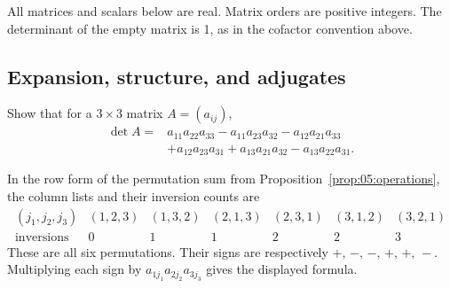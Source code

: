 All matrices and scalars below are real. Matrix orders are positive integers.
The determinant of the empty matrix is 1, as in the cofactor convention above.

\subsection*{Expansion, structure, and adjugates}

\begin{problem}\label{ex:05:six-terms}
Show that for a \(3\times3\) matrix \(A=(a_{ij})\),
\[
\begin{aligned}
\det A={}&a_{11}a_{22}a_{33}-a_{11}a_{23}a_{32}
-a_{12}a_{21}a_{33}\\
&+a_{12}a_{23}a_{31}+a_{13}a_{21}a_{32}
-a_{13}a_{22}a_{31}.
\end{aligned}
\]
\end{problem}
\begin{solution}
In the row form of the permutation sum from Proposition~\ref{prop:05:operations},
the column lists and their inversion
counts are
\[
\begin{array}{c|rrrrrr}
(j_1,j_2,j_3)&(1,2,3)&(1,3,2)&(2,1,3)&(2,3,1)&(3,1,2)&(3,2,1)\\
\text{inversions}&0&1&1&2&2&3
\end{array}
\]
These are all six permutations. Their signs are respectively
\(+,\,-,\,-,\,+,\,+,\,-\). Multiplying each sign by
\(a_{1j_1}a_{2j_2}a_{3j_3}\) gives the displayed formula.
\end{solution}

